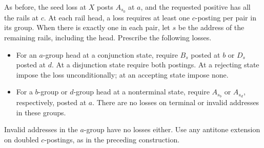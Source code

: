 As before, the seed loss at $X$ posts $A_{s_0}$ at $a$, and the
requested positive has all the rails at $c$. At each rail head, a loss
requires at least one $c$-posting per pair in its group. When there is
exactly one in each pair, let $s$ be the address of the remaining
rails, including the head. Prescribe the following losses.
\begin{itemize}
\item For an $a$-group head at a conjunction state, require $B_s$
posted at $b$ or $D_s$ posted at $d$. At a disjunction state require
both postings. At a rejecting state impose the loss unconditionally;
at an accepting state impose none.
\item For a $b$-group or $d$-group head at a nonterminal state,
require $A_{s_b}$ or $A_{s_d}$, respectively, posted at $a$. There
are no losses on terminal or invalid addresses in these groups.
\end{itemize}
Invalid addresses in the $a$-group have no losses either. Use any
antitone extension on doubled $c$-postings, as in the preceding
construction.

